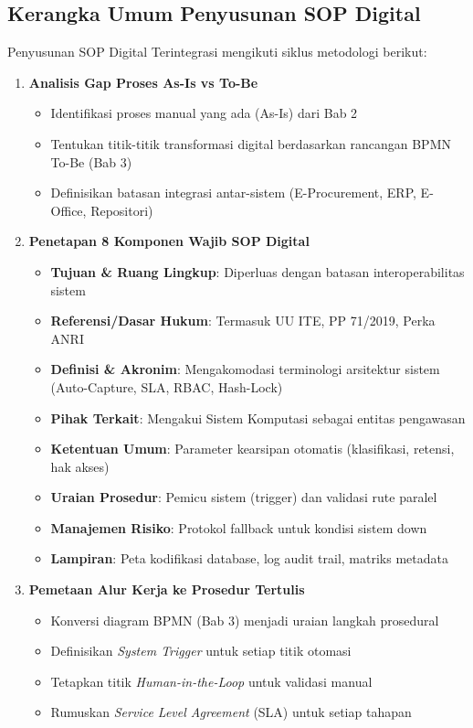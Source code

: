 \documentclass[12pt,a4paper]{report}
\begin{document}
\subsection{Kerangka Umum Penyusunan SOP Digital}

Penyusunan SOP Digital Terintegrasi mengikuti siklus metodologi berikut:

\begin{enumerate}[leftmargin=*]
\item \textbf{Analisis Gap Proses As-Is vs To-Be}
\begin{itemize}
\item Identifikasi proses manual yang ada (As-Is) dari Bab 2
\item Tentukan titik-titik transformasi digital berdasarkan rancangan BPMN To-Be (Bab 3)
\item Definisikan batasan integrasi antar-sistem (E-Procurement, ERP, E-Office, Repositori)
\end{itemize}

\item \textbf{Penetapan 8 Komponen Wajib SOP Digital}
\begin{itemize}
\item \textbf{Tujuan \& Ruang Lingkup}: Diperluas dengan batasan interoperabilitas sistem
\item \textbf{Referensi/Dasar Hukum}: Termasuk UU ITE, PP 71/2019, Perka ANRI
\item \textbf{Definisi \& Akronim}: Mengakomodasi terminologi arsitektur sistem (Auto-Capture, SLA, RBAC, Hash-Lock)
\item \textbf{Pihak Terkait}: Mengakui Sistem Komputasi sebagai entitas pengawasan
\item \textbf{Ketentuan Umum}: Parameter kearsipan otomatis (klasifikasi, retensi, hak akses)
\item \textbf{Uraian Prosedur}: Pemicu sistem (trigger) dan validasi rute paralel
\item \textbf{Manajemen Risiko}: Protokol fallback untuk kondisi sistem down
\item \textbf{Lampiran}: Peta kodifikasi database, log audit trail, matriks metadata
\end{itemize}

\item \textbf{Pemetaan Alur Kerja ke Prosedur Tertulis}
\begin{itemize}
\item Konversi diagram BPMN (Bab 3) menjadi uraian langkah prosedural
\item Definisikan \textit{System Trigger} untuk setiap titik otomasi
\item Tetapkan titik \textit{Human-in-the-Loop} untuk validasi manual
\item Rumuskan \textit{Service Level Agreement} (SLA) untuk setiap tahapan
\end{itemize}


\end{enumerate}
\end{document}

